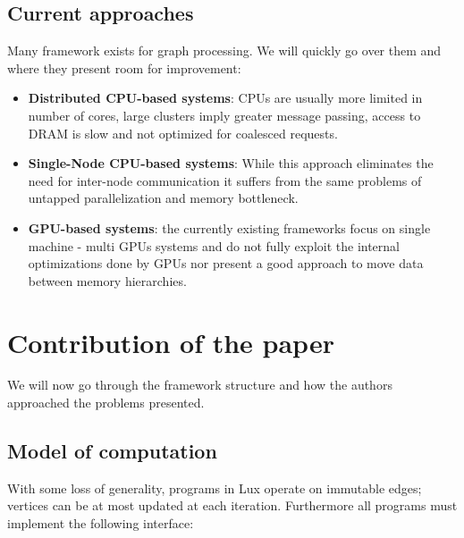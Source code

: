 \documentclass[]{article}
\begin{document}
\subsection{Current approaches}
Many framework exists for graph processing. We will quickly go over them and where they present room for improvement:
\begin{itemize}
	\item \textbf{Distributed CPU-based systems}: CPUs are usually more limited in number of cores, large clusters imply greater message passing, access to DRAM is slow and not optimized for coalesced requests.
	\item \textbf{Single-Node CPU-based systems}: While this approach eliminates the need for inter-node communication it suffers from the same problems of untapped parallelization and memory bottleneck.
	\item \textbf{GPU-based systems}: the currently existing frameworks focus on single machine - multi GPUs systems and do not fully exploit the internal optimizations done by GPUs nor present a good approach to move data between memory hierarchies.
\end{itemize}
 
 \section{Contribution of the paper}
 We will now go through the framework structure and how the authors approached the problems presented.
 \subsection{Model of computation}
 
With some loss of generality, programs in Lux operate on immutable edges; vertices can be at most updated at each iteration. Furthermore all programs must implement the following interface:
 
\end{document}
